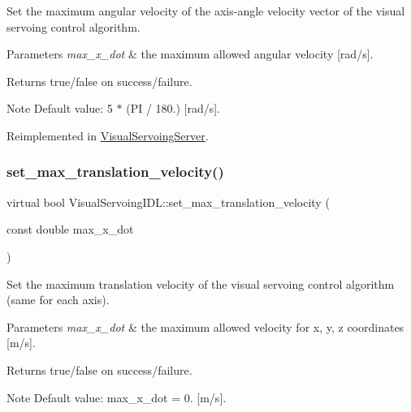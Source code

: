 Set the maximum angular velocity of the axis-\/angle velocity vector of the visual servoing control algorithm. 


\begin{DoxyParams}{Parameters}
{\em max\+\_\+x\+\_\+dot} & the maximum allowed angular velocity \mbox{[}rad/s\mbox{]}. \\
\hline
\end{DoxyParams}
\begin{DoxyReturn}{Returns}
true/false on success/failure. 
\end{DoxyReturn}
\begin{DoxyNote}{Note}
Default value\+: 5 $\ast$ (PI / 180.) \mbox{[}rad/s\mbox{]}. 
\end{DoxyNote}


Reimplemented in \hyperlink{classVisualServoingServer_aa3226ef2de2c1743e67788d1bff60679}{Visual\+Servoing\+Server}.

\mbox{\label{classVisualServoingIDL_af928c1409ad82c6b5fa1aff93ef9d0c4}} 
\subsubsection{\texorpdfstring{set\+\_\+max\+\_\+translation\+\_\+velocity()}{set\_max\_translation\_velocity()}}
{\footnotesize\ttfamily virtual bool Visual\+Servoing\+I\+D\+L\+::set\+\_\+max\+\_\+translation\+\_\+velocity (\begin{DoxyParamCaption}\item[{const double}]{max\+\_\+x\+\_\+dot }\end{DoxyParamCaption})\hspace{0.3cm}{\ttfamily [virtual]}}



Set the maximum translation velocity of the visual servoing control algorithm (same for each axis). 


\begin{DoxyParams}{Parameters}
{\em max\+\_\+x\+\_\+dot} & the maximum allowed velocity for x, y, z coordinates \mbox{[}m/s\mbox{]}. \\
\hline
\end{DoxyParams}
\begin{DoxyReturn}{Returns}
true/false on success/failure. 
\end{DoxyReturn}
\begin{DoxyNote}{Note}
Default value\+: max\+\_\+x\+\_\+dot = 0. \mbox{[}m/s\mbox{]}. 
\end{DoxyNote}


